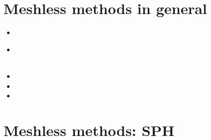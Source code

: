 \section{Meshless methods in general}

\begin{scriptsize}
\begin{itemize}
\item[\nineteenninetysix]
\item[\twothousand]
\\ 
\\
\item[\twothousandone]
\item[\twothousandtwo]
\item[\twothousandfour]
\end{itemize}
\end{scriptsize}

\section{Meshless methods: SPH}

